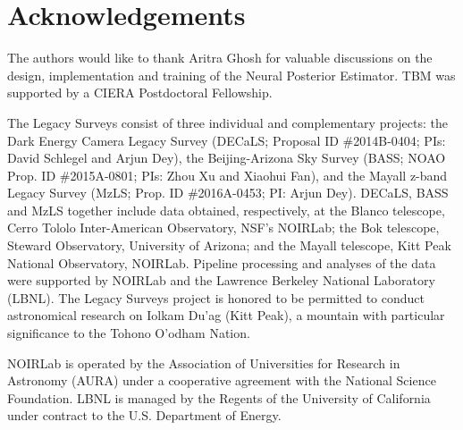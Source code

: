 \documentclass[twocolumn]{aastex631}
\begin{document}
\section*{Acknowledgements}
The authors would like to thank Aritra Ghosh for valuable discussions on the design, implementation and training of the Neural Posterior Estimator. TBM was supported by a CIERA Postdoctoral Fellowship.

The Legacy Surveys consist of three individual and complementary projects: the Dark Energy Camera Legacy Survey (DECaLS; Proposal ID \#2014B-0404; PIs: David Schlegel and Arjun Dey), the Beijing-Arizona Sky Survey (BASS; NOAO Prop. ID \#2015A-0801; PIs: Zhou Xu and Xiaohui Fan), and the Mayall z-band Legacy Survey (MzLS; Prop. ID \#2016A-0453; PI: Arjun Dey). DECaLS, BASS and MzLS together include data obtained, respectively, at the Blanco telescope, Cerro Tololo Inter-American Observatory, NSF’s NOIRLab; the Bok telescope, Steward Observatory, University of Arizona; and the Mayall telescope, Kitt Peak National Observatory, NOIRLab. Pipeline processing and analyses of the data were supported by NOIRLab and the Lawrence Berkeley National Laboratory (LBNL). The Legacy Surveys project is honored to be permitted to conduct astronomical research on Iolkam Du’ag (Kitt Peak), a mountain with particular significance to the Tohono O’odham Nation.

NOIRLab is operated by the Association of Universities for Research in Astronomy (AURA) under a cooperative agreement with the National Science Foundation. LBNL is managed by the Regents of the University of California under contract to the U.S. Department of Energy.
\end{document}
